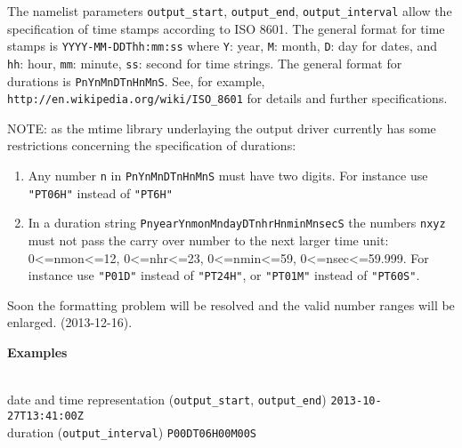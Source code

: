 The namelist parameters \texttt{output\_start}, \texttt{output\_end}, \texttt{output\_interval} allow
the specification of time stamps according to ISO 8601.
The general format for time stamps is \texttt{YYYY-MM-DDThh:mm:ss}
where \texttt{Y}: year, \texttt{M}: month, \texttt{D}: day for dates, 
and   \texttt{hh}: hour, \texttt{mm}: minute, \texttt{ss}: second for time strings.  
The general format for durations is \texttt{PnYnMnDTnHnMnS}.
See, for example, \texttt{http://en.wikipedia.org/wiki/ISO\_8601} for details and further specifications.

\color{red}NOTE: as the mtime library underlaying the output driver
  currently has some restrictions concerning the specification of durations:\begin{enumerate}
\item Any number \texttt{n} in \texttt{PnYnMnDTnHnMnS} must have two digits. For instance use \texttt{"PT06H"} instead of \texttt{"PT6H"}
\item In a duration string \texttt{PnyearYnmonMndayDTnhrHnminMnsecS} the numbers \texttt{nxyz} must not pass the carry over number to the next larger time unit: 0<=nmon<=12, 0<=nhr<=23, 0<=nmin<=59, 0<=nsec<=59.999. For instance use \texttt{"P01D"} instead of \texttt{"PT24H"}, or \texttt{"PT01M"} instead of \texttt{"PT60S"}.
\end{enumerate}

Soon the formatting problem will be resolved and the valid number ranges will be enlarged.
(2013-12-16).\color{black}

\begin{tabbing}
  \parbox{0.7\textwidth}{\textbf{Examples}} \= \\
  date and time representation (\texttt{output\_start}, \texttt{output\_end}) \>
  \texttt{2013-10-27T13:41:00Z} \\
  duration (\texttt{output\_interval}) \>
  \texttt{P00DT06H00M00S} \\
\end{tabbing}



